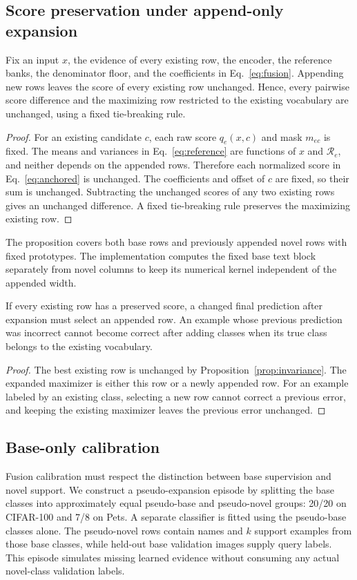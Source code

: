 \documentclass[research]{fcs}
\begin{document}
\subsection{Score preservation under append-only expansion}
\begin{proposition}
Fix an input $x$, the evidence of every existing row, the encoder, the reference banks, the denominator floor, and the coefficients in Eq.~\eqref{eq:fusion}. Appending new rows leaves the score of every existing row unchanged. Hence, every pairwise score difference and the maximizing row restricted to the existing vocabulary are unchanged, using a fixed tie-breaking rule.
\label{prop:invariance}
\end{proposition}
\begin{proof}
For an existing candidate $c$, each raw score $q_e(x,c)$ and mask $m_{ec}$ is fixed. The means and variances in Eq.~\eqref{eq:reference} are functions of $x$ and $\mathcal R_e$, and neither depends on the appended rows. Therefore each normalized score in Eq.~\eqref{eq:anchored} is unchanged. The coefficients and offset of $c$ are fixed, so their sum is unchanged. Subtracting the unchanged scores of any two existing rows gives an unchanged difference. A fixed tie-breaking rule preserves the maximizing existing row.
\end{proof}

The proposition covers both base rows and previously appended novel rows with fixed prototypes. The implementation computes the fixed base text block separately from novel columns to keep its numerical kernel independent of the appended width.

\begin{corollary}
If every existing row has a preserved score, a changed final prediction after expansion must select an appended row. An example whose previous prediction was incorrect cannot become correct after adding classes when its true class belongs to the existing vocabulary.
\label{cor:competition}
\end{corollary}
\begin{proof}
The best existing row is unchanged by Proposition~\ref{prop:invariance}. The expanded maximizer is either this row or a newly appended row. For an example labeled by an existing class, selecting a new row cannot correct a previous error, and keeping the existing maximizer leaves the previous error unchanged.
\end{proof}

\subsection{Base-only calibration}
\label{sec:calibration}
Fusion calibration must respect the distinction between base supervision and novel support. We construct a pseudo-expansion episode by splitting the base classes into approximately equal pseudo-base and pseudo-novel groups: 20/20 on CIFAR-100 and 7/8 on Pets. A separate classifier is fitted using the pseudo-base classes alone. The pseudo-novel rows contain names and $k$ support examples from those base classes, while held-out base validation images supply query labels. This episode simulates missing learned evidence without consuming any actual novel-class validation labels.
\end{document}
